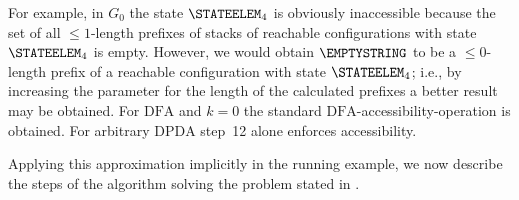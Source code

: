 \documentclass[draft]{ifacconf}
\newcommand{\STEP}[1]{\ensuremath{G_{#1}}\xspace}
\newcommand{\DFA}{\ensuremath{\mathrm{DFA}}\xspace}
\newcommand{\DPDA}{\ensuremath{\mathrm{DPDA}}\xspace}
\begin{document}
For example, in $\STEP{0}$ the state $\STATEELEM_4$ is obviously inaccessible because the set of all ${\leq}1$-length prefixes of stacks of reachable configurations with state $\STATEELEM_4$ is empty. However, we would obtain $\EMPTYSTRING$ to be a ${\leq}0$-length prefix of a reachable configuration with state $\STATEELEM_4$; i.e., by increasing the parameter for the length of the calculated prefixes a better result may be obtained. For \DFA and $k=0$ the standard \DFA-accessibility-operation is obtained.
For arbitrary \DPDA step~12 alone enforces accessibility.

\newcommand{\OPNAME}[1]{\ensuremath{f_{\mathrm{#1}}}\xspace}
\newcommand{\FUNtoSDPDA}{\OPNAME{2SDPDA}}
\newcommand{\FUNfreshSymbol}{\OPNAME{fresh}}
\newcommand{\FUNRNoOp}{\OPNAME{NoNoOp}}
\newcommand{\FUNSPP}{\OPNAME{SPP}}
\newcommand{\FUNRMP}{\OPNAME{RMP}}
\newcommand{\FUNSR}{\OPNAME{SR}}
\newcommand{\epdagamma}{\mathrm{epda\underbar{ }gamma}}
\newcommand{\mathlet}{\mathrm{let}~}
\newcommand{\mathin}{~\mathrm{in}~}

Applying this approximation implicitly in the running example, we now describe the steps of the algorithm solving the problem stated in .
\end{document}
